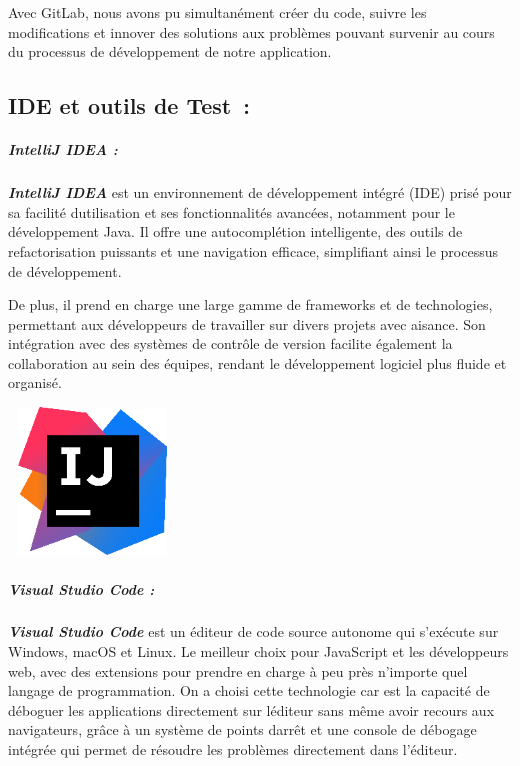 \documentclass[12pt,a4paper,twoside]{report}
\begin{document}
Avec
GitLab, nous avons pu simultanément créer du code, suivre les
modifications et innover des solutions aux problèmes pouvant survenir au
cours du processus de développement de notre application.

\hypertarget{ide-et-outils-de-test}{%
\subsection{IDE et outils de Test~:}\label{ide-et-outils-de-test}}

\hypertarget{intellij-idea}{%
\subparagraph{IntelliJ IDEA :}\label{intellij-idea}}

\emph{\textbf{IntelliJ IDEA}} est un environnement de développement
intégré (IDE) prisé pour sa facilité d\textquotesingle utilisation et
ses fonctionnalités avancées, notamment pour le développement Java. Il
offre une autocomplétion intelligente, des outils de refactorisation
puissants et une navigation efficace, simplifiant ainsi le processus de
développement.

De plus, il prend en charge une large gamme de frameworks et de
technologies, permettant aux développeurs de travailler sur divers
projets avec aisance. Son intégration avec des systèmes de contrôle de
version facilite également la collaboration au sein des équipes, rendant
le développement logiciel plus fluide et organisé.

\includegraphics[width=1.76111in,height=1.54444in]{latex_media/media/image31.png}

\hypertarget{visual-studio-code}{%
\subparagraph{Visual Studio Code :}\label{visual-studio-code}}

\emph{\textbf{Visual Studio Code}} est un éditeur de code source
autonome qui s'exécute sur Windows, macOS et Linux. Le meilleur choix
pour JavaScript et les développeurs web, avec des extensions pour
prendre en charge à peu près n'importe quel langage de programmation. On
a choisi cette technologie car est la capacité de déboguer les
applications directement sur l\textquotesingle éditeur sans même avoir
recours aux navigateurs, grâce à un système de points
d\textquotesingle arrêt et une console de débogage intégrée qui permet
de résoudre les problèmes directement dans l'éditeur.~
\end{document}

